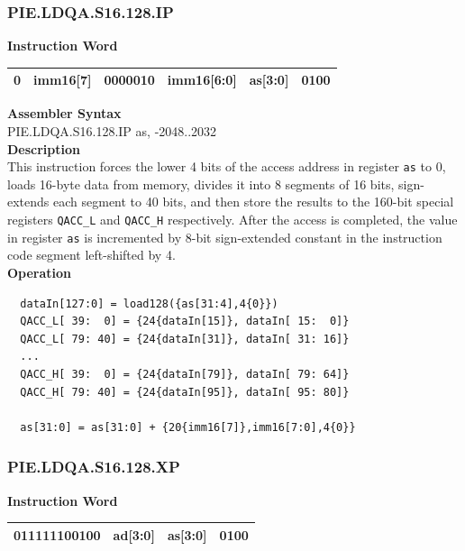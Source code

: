 \newpage
\subsubsection{PIE.LDQA.S16.128.IP}\label{instruction:PIELDQAS16128IP}
\setlength\tabcolsep{6pt}
\textbf{Instruction Word} \\
\begin{tabular}{|c|c|c|c|c|c|}
	\hline
	0 & imm16[7] & 0000010 & imm16[6:0] & as[3:0] & 0100 \\
	\hline
\end{tabular}

\textbf{Assembler Syntax} \\
PIE.LDQA.S16.128.IP as, -2048..2032 \\
\textbf{Description} \\
This instruction forces the lower 4 bits of the access address in register \lstinline{as} to 0, loads 16-byte data from memory, divides it into 8 segments of 16 bits, sign-extends each segment to 40 bits, and then store the results to the 160-bit special registers \lstinline{QACC_L} and \lstinline{QACC_H} respectively. After the access is completed, the value in register \lstinline{as} is incremented by 8-bit sign-extended constant in the instruction code segment left-shifted by 4.\\
\textbf{Operation}
\begin{lstlisting}
  dataIn[127:0] = load128({as[31:4],4{0}})
  QACC_L[ 39:  0] = {24{dataIn[15]}, dataIn[ 15:  0]}
  QACC_L[ 79: 40] = {24{dataIn[31]}, dataIn[ 31: 16]}
  ...
  QACC_H[ 39:  0] = {24{dataIn[79]}, dataIn[ 79: 64]}
  QACC_H[ 79: 40] = {24{dataIn[95]}, dataIn[ 95: 80]}

  as[31:0] = as[31:0] + {20{imm16[7]},imm16[7:0],4{0}}
\end{lstlisting}

\newpage
\subsubsection{PIE.LDQA.S16.128.XP}\label{instruction:PIELDQAS16128XP}
\setlength\tabcolsep{6pt}
\textbf{Instruction Word} \\
\begin{tabular}{|c|c|c|c|}
	\hline
	011111100100 & ad[3:0] & as[3:0] & 0100 \\
	\hline
\end{tabular}

